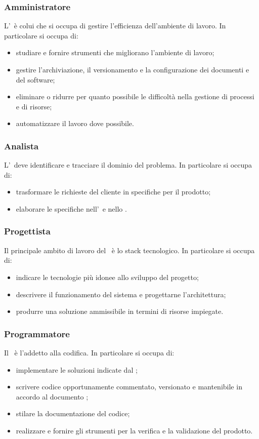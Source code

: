 \documentclass[../NormeDiProgetto.tex]{subfiles}
\begin{document}
			\subsubsection{Amministratore}
				L'\amministratore\ è colui che si occupa di gestire l'efficienza dell'ambiente di lavoro. 
				In particolare si occupa di:
				\begin{itemize}
					\item studiare e fornire strumenti che migliorano l'ambiente di lavoro;
					\item gestire l'archiviazione, il versionamento e la configurazione dei documenti e del software;
					\item eliminare o ridurre per quanto possibile le difficoltà nella gestione di processi e di risorse;
					\item automatizzare il lavoro dove possibile.
				\end{itemize}
			\subsubsection{Analista}
				L'\analista\ deve identificare e tracciare il dominio del problema. 
				In particolare si occupa di:
				\begin{itemize}
					\item trasformare le richieste del cliente in specifiche per il prodotto;
					\item elaborare le specifiche nell'\analisideirequisiti\ e nello \studiodifattibilita.
				\end{itemize} 
			\subsubsection{Progettista}
				Il principale ambito di lavoro del \progettista\ è lo stack tecnologico.
				In particolare si occupa di:
				\begin{itemize}
					\item indicare le tecnologie più idonee allo sviluppo del progetto;
					\item descrivere il funzionamento del sistema e progettarne l'architettura;
					\item produrre una soluzione ammissibile in termini di risorse impiegate.
				\end{itemize}	
			\subsubsection{Programmatore}
				Il \programmatore\ è l'addetto alla codifica.
				In particolare si occupa di:
				\begin{itemize}
					\item implementare le soluzioni indicate dal \progettista;
					\item scrivere codice opportunamente commentato, versionato e mantenibile in accordo al documento \normediprogetto;
					\item stilare la documentazione del codice;
					\item realizzare e fornire gli strumenti per la verifica e la validazione del prodotto.
				\end{itemize}
\end{document}
